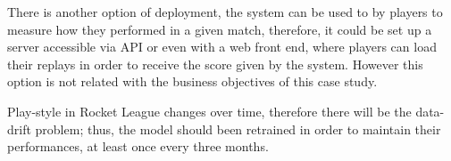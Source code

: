 There is another option of deployment, the system can be used to by players to measure how they performed in a given match, therefore, it could be set up a server accessible via API or even with a web front end, where players can load their replays in order to receive the score given by the system. However this option is not related with the business objectives of this case study.

Play-style in Rocket League changes over time, therefore there will be the data-drift problem; thus, the model should been retrained in order to maintain their performances, at least once every three months.
